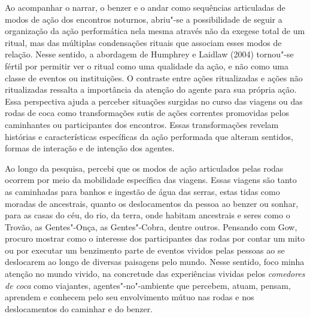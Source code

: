 Ao acompanhar o narrar, o benzer e o andar como sequências articuladas
de modos de ação dos encontros noturnos, abriu"-se a possibilidade de
seguir a organização da ação performática nela mesma através não da
exegese total de um ritual, mas das múltiplas condensações rituais que
associam esses modos de relação. Nesse sentido, a abordagem de Humphrey
e Laidlaw (2004) tornou"-se fértil por permitir ver o ritual como uma
qualidade da ação, e não como uma classe de eventos ou instituições. O
contraste entre ações ritualizadas e ações não ritualizadas ressalta a
importância da atenção do agente para sua própria ação. Essa perspectiva
ajuda a perceber situações surgidas no curso das viagens ou das rodas de
coca como transformações sutis de ações correntes promovidas pelos
caminhantes ou participantes dos encontros. Essas transformações revelam
histórias e características específicas da ação performada que alteram
sentidos, formas de interação e de intenção dos agentes.

Ao longo da pesquisa, percebi que os modos de ação articulados pelas
rodas ocorrem por meio da mobilidade específica das viagens. Essas
viagens são tanto as caminhadas para banhos e ingestão de água das
serras, estas tidas como moradas de ancestrais, quanto os deslocamentos
da pessoa ao benzer ou sonhar, para as casas do céu, do rio, da terra,
onde habitam ancestrais e seres como o Trovão, as Gentes"-Onça, as
Gentes"-Cobra, dentre outros. Pensando com Gow, procuro mostrar como o
interesse dos participantes das rodas por contar um mito ou por executar
um benzimento parte de eventos vividos pelas pessoas ao se deslocarem ao
longo de diversas paisagens pelo mundo. Nesse sentido, foco minha
atenção no mundo vivido, na concretude das experiências vividas pelos
\textit{comedores de coca} como viajantes, agentes"-no"-ambiente que percebem,
atuam, pensam, aprendem e conhecem pelo seu envolvimento mútuo nas rodas
e nos deslocamentos do caminhar e do benzer.

